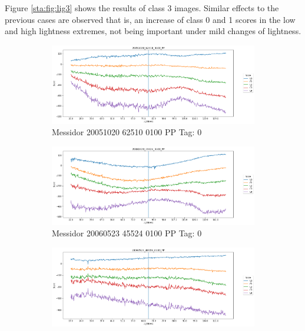 Figure \ref{sta:fig:lig3} shows the results of class 3 images. Similar effects to the previous cases are observed that is, an increase of class 0 and 1 scores in the low and high lightness extremes, not being important under mild changes of lightness.

\begin{figure}[ht!]
	\centering
	\begin{subfigure}[b]{ 0.85\textwidth}
		\centering
		\includegraphics[width=\textwidth]{Figures/chapter_stability/20051020_62510_0100_PP/l/scores.png}
		\caption{Messidor 20051020 62510 0100 PP Tag: 0}
	\end{subfigure}
	\begin{subfigure}[b]{ 0.85\textwidth}
		\centering
		\includegraphics[width=\textwidth]{Figures/chapter_stability/20060523_45524_0100_PP/l/scores.png}
		\caption{Messidor 20060523 45524 0100 PP Tag: 0}		
	\end{subfigure}	
	\begin{subfigure}[b]{ 0.85\textwidth}
		\centering
		\includegraphics[width=\textwidth]{Figures/chapter_stability/20060523_48709_0100_PP/l/scores.png}

\end{subfigure}
\end{figure}
